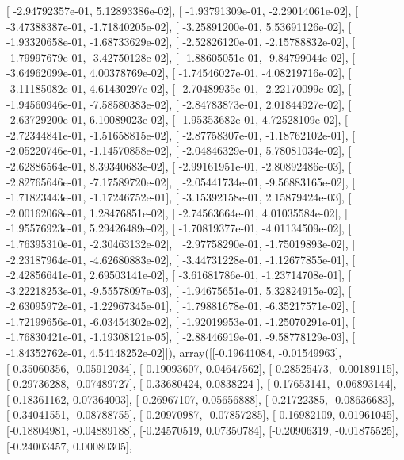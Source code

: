 \documentclass{article}
\begin{document}
       [ -2.94792357e-01,   5.12893386e-02],
       [ -1.93791309e-01,  -2.29014061e-02],
       [ -3.47388387e-01,  -1.71840205e-02],
       [ -3.25891200e-01,   5.53691126e-02],
       [ -1.93320658e-01,  -1.68733629e-02],
       [ -2.52826120e-01,  -2.15788832e-02],
       [ -1.79997679e-01,  -3.42750128e-02],
       [ -1.88605051e-01,  -9.84799044e-02],
       [ -3.64962099e-01,   4.00378769e-02],
       [ -1.74546027e-01,  -4.08219716e-02],
       [ -3.11185082e-01,   4.61430297e-02],
       [ -2.70489935e-01,  -2.22170099e-02],
       [ -1.94560946e-01,  -7.58580383e-02],
       [ -2.84783873e-01,   2.01844927e-02],
       [ -2.63729200e-01,   6.10089023e-02],
       [ -1.95353682e-01,   4.72528109e-02],
       [ -2.72344841e-01,  -1.51658815e-02],
       [ -2.87758307e-01,  -1.18762102e-01],
       [ -2.05220746e-01,  -1.14570858e-02],
       [ -2.04846329e-01,   5.78081034e-02],
       [ -2.62886564e-01,   8.39340683e-02],
       [ -2.99161951e-01,  -2.80892486e-03],
       [ -2.82765646e-01,  -7.17589720e-02],
       [ -2.05441734e-01,  -9.56883165e-02],
       [ -1.71823443e-01,  -1.17246752e-01],
       [ -3.15392158e-01,   2.15879424e-03],
       [ -2.00162068e-01,   1.28476851e-02],
       [ -2.74563664e-01,   4.01035584e-02],
       [ -1.95576923e-01,   5.29426489e-02],
       [ -1.70819377e-01,  -4.01134509e-02],
       [ -1.76395310e-01,  -2.30463132e-02],
       [ -2.97758290e-01,  -1.75019893e-02],
       [ -2.23187964e-01,  -4.62680883e-02],
       [ -3.44731228e-01,  -1.12677855e-01],
       [ -2.42856641e-01,   2.69503141e-02],
       [ -3.61681786e-01,  -1.23714708e-01],
       [ -3.22218253e-01,  -9.55578097e-03],
       [ -1.94675651e-01,   5.32824915e-02],
       [ -2.63095972e-01,  -1.22967345e-01],
       [ -1.79881678e-01,  -6.35217571e-02],
       [ -1.72199656e-01,  -6.03454302e-02],
       [ -1.92019953e-01,  -1.25070291e-01],
       [ -1.76830421e-01,  -1.19308121e-05],
       [ -2.88446919e-01,  -9.58778129e-03],
       [ -1.84352762e-01,   4.54148252e-02]]), array([[-0.19641084, -0.01549963],
       [-0.35060356, -0.05912034],
       [-0.19093607,  0.04647562],
       [-0.28525473, -0.00189115],
       [-0.29736288, -0.07489727],
       [-0.33680424,  0.0838224 ],
       [-0.17653141, -0.06893144],
       [-0.18361162,  0.07364003],
       [-0.26967107,  0.05656888],
       [-0.21722385, -0.08636683],
       [-0.34041551, -0.08788755],
       [-0.20970987, -0.07857285],
       [-0.16982109,  0.01961045],
       [-0.18804981, -0.04889188],
       [-0.24570519,  0.07350784],
       [-0.20906319, -0.01875525],
       [-0.24003457,  0.00080305],
\end{document}
